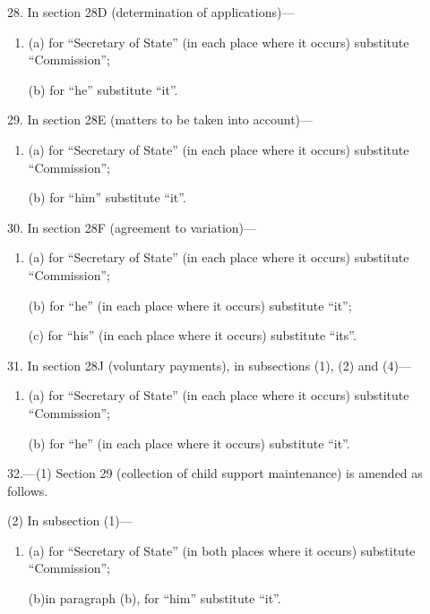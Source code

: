 \documentclass[a4paper]{article}
\begin{document}
\medskip

28. In section 28D (determination of applications)—
\begin{enumerate}\item[]
(a) for “Secretary of State” (in each place where it occurs) substitute “Commission”;

(b) for “he” substitute “it”.
\end{enumerate}

\medskip

29. In section 28E (matters to be taken into account)—
\begin{enumerate}\item[]
(a) for “Secretary of State” (in each place where it occurs) substitute “Commission”;

(b) for “him” substitute “it”.
\end{enumerate}

\medskip

30. In section 28F (agreement to variation)—
\begin{enumerate}\item[]
(a) for “Secretary of State” (in each place where it occurs) substitute “Commission”;

(b) for “he” (in each place where it occurs) substitute “it”;

(c) for “his” (in each place where it occurs) substitute “its”.
\end{enumerate}

\medskip

31. In section 28J (voluntary payments), in subsections (1), (2) and (4)—
\begin{enumerate}\item[]
(a) for “Secretary of State” (in each place where it occurs) substitute “Commission”;

(b) for “he” (in each place where it occurs) substitute “it”.
\end{enumerate}

\medskip

32.---(1) Section 29 (collection of child support maintenance) is amended as follows.

(2) In subsection (1)—
\begin{enumerate}\item[]
(a) for “Secretary of State” (in both places where it occurs) substitute “Commission”;

(b)in paragraph (b), for “him” substitute “it”.
\end{enumerate}
\end{document}
